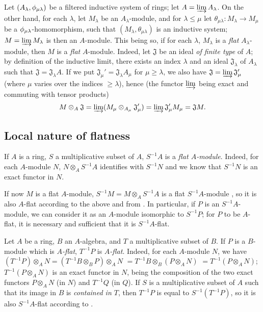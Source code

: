 \begin{env}[6.2.3]
\label{0.6.2.3}
Let $(A_\lambda,\phi_{\mu\lambda})$ be a filtered inductive system of rings;
let $A=\varinjlim A_\lambda$. On the other hand, for each $\lambda$, let
$M_\lambda$ be an $A_\lambda$-module, and for $\lambda\leq\mu$ let
$\theta_{\mu\lambda}:M_\lambda\to M_\mu$ be a $\phi_{\mu\lambda}$-homomorphism,
such that $(M_\lambda,\theta_{\mu\lambda})$ is an inductive system;
$M=\varinjlim M_\lambda$ is then an $A$-module. This being so, if for each
$\lambda$, $M_\lambda$ is a \emph{flat} $A_\lambda$-module, then $M$ is a
\emph{flat} $A$-module. Indeed, let $\mathfrak{J}$ be an ideal \emph{of finite
type} of $A$; by definition of the inductive limit, there exists an index
$\lambda$ and an ideal $\mathfrak{J}_\lambda$ of $A_\lambda$ such that
$\mathfrak{J}=\mathfrak{J}_\lambda A$. If we put
$\mathfrak{J}_\mu'=\mathfrak{J}_\lambda A_\mu$ for $\mu\geq\lambda$, we
also have $\mathfrak{J}=\varinjlim\mathfrak{J}_\mu'$ (where $\mu$ varies over
the indices $\geq\lambda$), hence (the functor $\varinjlim$ being exact and
commuting with tensor products)
\[
  M\otimes_A\mathfrak{J}=\varinjlim(M_\mu\otimes_{A_\mu}\mathfrak{J}_\mu')
  =\varinjlim\mathfrak{J}_\mu' M_\mu=\mathfrak{J}M.
\]
\end{env}

\subsection{Local nature of flatness}
\label{subsection:0.6.3}

\begin{env}[6.3.1]
\label{0.6.3.1}
If $A$ is a ring, $S$ a multiplicative subset of $A$, $S^{-1}A$ is a \emph{flat $A$-module}.
Indeed, for each $A$-module $N$, $N\otimes_A S^{-1}A$ identifies with $S^{-1}N$ 
and we know  that $S^{-1}N$ is an exact functor in $N$.

If now $M$ is a flat $A$-module, $S^{-1}M=M\otimes_A S^{-1}A$ is a flat
$S^{-1}A$-module , so it is also $A$-flat according to the
above and from . In particular, if $P$ is an $S^{-1}A$-module,
we can consider it as an $A$-module isomorphic to $S^{-1}P$; for $P$ to be
$A$-flat, it is necessary and sufficient that it is $S^{-1}A$-flat.
\end{env}

\begin{env}[6.3.2]
\label{0.6.3.2}
Let $A$ be a ring, $B$ an $A$-algebra, and $T$ a multiplicative subset of $B$.
If $P$ is a $B$-module which is \emph{$A$-flat}, $T^{-1}P$ is \emph{$A$-flat}.
Indeed, for each $A$-module $N$, we have
$(T^{-1}P)\otimes_A N=(T^{-1}B\otimes_B P)\otimes_A N$
$=T^{-1}B\otimes_B(P\otimes_A N)$
$=T^{-1}(P\otimes_A N)$; $T^{-1}(P\otimes_A N)$ is an exact functor in $N$,
being the composition of the two exact functors $P\otimes_A N$ (in $N$) and
$T^{-1}Q$ (in $Q$). If $S$ is a multiplicative subset of $A$ such that its image
in $B$ is \emph{contained in $T$}, then $T^{-1}P$ is equal to $S^{-1}(T^{-1}P)$,
so it is also $S^{-1}A$-flat according to .
\end{env}

